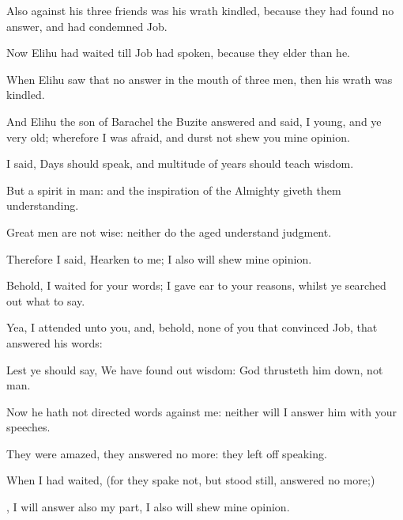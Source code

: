 {Also against his
three
friends was his
wrath
kindled, because they had
found no
answer, and
{} had
condemned
Job.

Now
Elihu had
waited till
Job had
spoken, because they
{}
elder than he.

When
Elihu
saw that
{} no
answer in the
mouth of
{}
three
men, then his
wrath was
kindled.


\par }{\PP {}And
Elihu the
son of
Barachel the
Buzite
answered and
said, I
{}
young, and ye
{} very
old; wherefore I was
afraid, and
durst not
shew you mine
opinion.

I
said,
Days should
speak, and
multitude of
years should
teach
wisdom.

But
{} a
spirit in
man: and the
inspiration of the
Almighty giveth them
understanding.

Great
men are not
{}
wise: neither do the
aged
understand
judgment.

Therefore I
said,
Hearken to me; I also will
shew mine
opinion.

Behold, I
waited for your
words; I gave
ear to your
reasons, whilst ye searched
out what to
say.

Yea, I
attended unto you, and, behold,
{} none of you that
convinced
Job,
{} that
answered his
words:

Lest ye should
say, We have found
out
wisdom:
God thrusteth him
down, not
man.

Now he hath not
directed
{}
words against me: neither will I
answer him with your
speeches.


\par }{\PP {}They were
amazed, they
answered no more: they left
off
speaking.

When I had
waited, (for they
spake not, but stood
still,
{}
answered no more;)

, I will
answer also my
part, I also will
shew mine
opinion.

}
